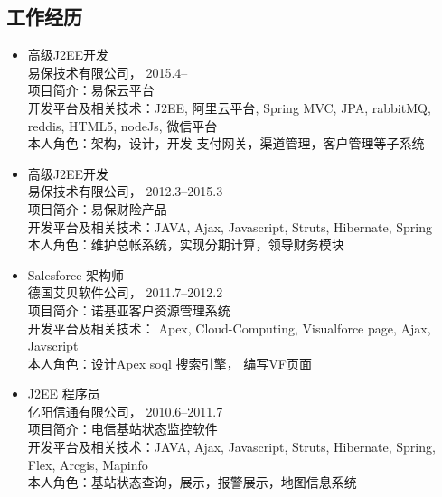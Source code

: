 \documentclass{res}
\begin{document}
\begin{CJK}{UTF8}{song}
\begin{resume}
    \section{工作经历}
    \begin{itemize}
    \item{ 高级J2EE开发}\\
      { 易保技术有限公司}， \hfill 2015.4--\\
      项目简介：易保云平台\\
      开发平台及相关技术：J2EE, 阿里云平台, Spring MVC, JPA,
      rabbitMQ, reddis, HTML5, nodeJs, 微信平台\\
      本人角色：架构，设计，开发 支付网关，渠道管理，客户管理等子系统\\
    \item{ 高级J2EE开发}\\
      { 易保技术有限公司}， \hfill 2012.3--2015.3\\
      项目简介：易保财险产品\\
      开发平台及相关技术：JAVA, Ajax, Javascript, Struts, Hibernate, Spring\\
      本人角色：维护总帐系统，实现分期计算，领导财务模块\\
    \item{ Salesforce 架构师}\\
      { 德国艾贝软件公司}， \hfill 2011.7--2012.2\\
      项目简介：诺基亚客户资源管理系统\\
      开发平台及相关技术： Apex, Cloud-Computing, Visualforce page, Ajax, Javscript\\
      本人角色：设计Apex soql 搜索引擎， 编写VF页面\\
    \item{ J2EE 程序员}\\
      { 亿阳信通有限公司}， \hfill 2010.6--2011.7\\
      项目简介：电信基站状态监控软件\\
      开发平台及相关技术：JAVA, Ajax, Javascript, Struts, Hibernate, Spring, Flex, Arcgis, Mapinfo\\
      本人角色：基站状态查询，展示，报警展示，地图信息系统\\

\end{itemize}
\end{resume}
\end{CJK}
\end{document}
